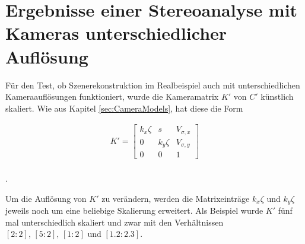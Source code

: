 \label{sec:realAuf} 

\section{Ergebnisse einer Stereoanalyse mit Kameras unterschiedlicher Auflösung}

Für den Test, ob Szenerekonstruktion im Realbeispiel auch mit unterschiedlichen Kameraauflösungen funktioniert, wurde die Kameramatrix $K'$ von $C'$ künstlich skaliert. Wie aus Kapitel \ref{sec:CameraModels}, hat diese die Form



\begin{gather}
K'=\begin{bmatrix}
k_x\zeta&s&V_{\sigma,x}\\
0&k_y\zeta&V_{\sigma,y}\\
0&0&1
\end{bmatrix}
\end{gather} \\
.


Um die Auflösung von $K'$ zu verändern, werden die Matrixeinträge $k_x \zeta$ und $k_y \zeta$ jeweils noch um eine beliebige Skalierung erweitert. Als Beispiel wurde $K'$ fünf mal unterschiedlich skaliert und zwar mit den Verhältnissen $[2:2], \, [5:2],\, [1:2]$ und $[1.2:2.3]$.  


